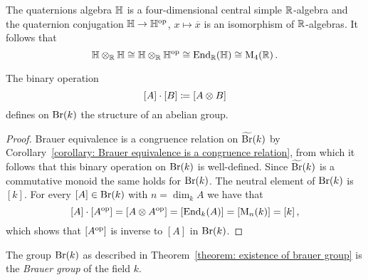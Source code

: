 

\begin{example}
  The quaternions algebra $\mathbb{H}$ is a four-dimensional central simple $\mathbb{R}$-algebra and the quaternion conjugation $\mathbb{H} \to \mathbb{H}^{\mathrm{op}}$, $x \mapsto \overline{x}$ is an isomorphism of $\mathbb{R}$-algebras.
  It follows that
  \[
          \mathbb{H} \otimes_{\mathbb{R}} \mathbb{H}
    \cong \mathbb{H} \otimes_{\mathbb{R}} \mathbb{H}^{\mathrm{op}}
    \cong \operatorname{End}_{\mathbb{R}}(\mathbb{H})
    \cong \operatorname{M}_4(\mathbb{R}) \,.
  \]
\end{example}


\begin{theorem}
  \label{theorem: existence of brauer group}
  The binary operation
  \[
              [A] \cdot [B]
    \coloneqq  [A \otimes B]
  \]
  defines on $\operatorname{Br}(k)$ the structure of an abelian group.
\end{theorem}


\begin{proof}
  Brauer equivalence is a congruence relation on $\widetilde{\operatorname{Br}}(k)$ by Corollary~\ref{corollary: Brauer equivalence is a congruence relation}, from which it follows that this binary operation on $\operatorname{Br}(k)$ is well-defined.
  Since $\widetilde{\operatorname{Br}}(k)$ is a commutative monoid the same holds for $\operatorname{Br}(k)$.
  The neutral element of $\operatorname{Br}(k)$ is $[k]$.
  For every $[A] \in \operatorname{Br}(k)$ with $n = \dim_k A$ we have that
  \[
      [A] \cdot [A^{\mathrm{op}}]
    = [A \otimes A^{\mathrm{op}}]
    = [\operatorname{End}_k(A)]
    = [\operatorname{M}_n(k)]
    = [k] \,,
  \]
  which shows that $[A^{\mathrm{op}}]$ is inverse to $[A]$ in $\operatorname{Br}(k)$.
\end{proof}


\begin{definition}
  The group $\operatorname{Br}(k)$ as described in Theorem~\ref{theorem: existence of brauer group} is the \emph{Brauer group} of the field $k$.
\end{definition}


